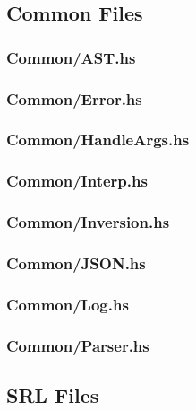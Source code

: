 \subsection{Common Files}
\label{app:Common_files}
\subsubsection{Common/AST.hs}
\label{app:Common_AST_hs}

\subsubsection{Common/Error.hs}
\label{app:Common_Error_hs}

\subsubsection{Common/HandleArgs.hs}
\label{app:Common_HandleArgs_hs}

\subsubsection{Common/Interp.hs}
\label{app:Common_Interp_hs}

\subsubsection{Common/Inversion.hs}
\label{app:Common_Inversion_hs}

\subsubsection{Common/JSON.hs}
\label{app:Common_JSON_hs}

\subsubsection{Common/Log.hs}\label{app:Common_Log_hs}

\subsubsection{Common/Parser.hs}
\label{app:Common_Parser_hs}

\subsection{SRL Files}
\label{app:SRL_files}
